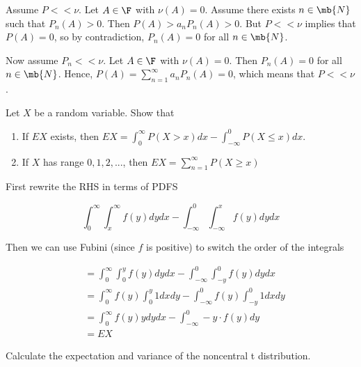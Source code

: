 \documentclass[]{book}
\providecommand{\tightlist}{%
  \setlength{\itemsep}{0pt}\setlength{\parskip}{0pt}}
\theoremstyle{definition}
\theoremstyle{definition}
\theoremstyle{definition}
\theoremstyle{remark}
\let\BeginKnitrBlock\begin \let\EndKnitrBlock\end
\begin{document}
\BeginKnitrBlock{solution}[Ex 35 b)]
\iffalse{} {Solution (Ex 35 b)). } \fi{}Assume \(P << \nu\). Let
\(A \in \F\) with \(\nu(A) = 0\). Assume there exists \(n \in \mb{N}\)
such that \(P_n(A) > 0\). Then \(P(A) > a_n P_n(A) > 0\). But
\(P << \nu\) implies that \(P(A) = 0\), so by contradiction,
\(P_n(A) = 0\) for all \(n \in \mb{N}\).

Now assume \(P_n << \nu\). Let \(A \in \F\) with \(\nu(A) = 0\). Then
\(P_n(A) = 0\) for all \(n \in \mb{N}\). Hence,
\(P(A) = \sum_{n=1}^\infty a_n P_n(A) = 0\), which means that
\(P << \nu\).
\EndKnitrBlock{solution}

\BeginKnitrBlock{exercise}[Ex 50]
\protect\hypertarget{exr:unnamed-chunk-47}{}{\label{exr:unnamed-chunk-47}
\iffalse (Ex 50) \fi{} }
\EndKnitrBlock{exercise}

\BeginKnitrBlock{exercise}[Ex 55]
\protect\hypertarget{exr:unnamed-chunk-48}{}{\label{exr:unnamed-chunk-48}
\iffalse (Ex 55) \fi{} } Let \(X\) be a random variable. Show that

\begin{enumerate}
\def\labelenumi{(\alph{enumi})}
\tightlist
\item
  If \(E X\) exists, then
  \(E X = \int_0^\infty P(X > x) dx - \int_{-\infty}^0 P(X \le x) dx\).
\item
  If \(X\) has range \(0, 1, 2, ...\), then
  \(E X = \sum_{n=1}^\infty P(X \ge x)\)
\end{enumerate}
\EndKnitrBlock{exercise}

\BeginKnitrBlock{solution}[EX 55 (a)]
\iffalse{} {Solution (EX 55 (a)). } \fi{} First rewrite the RHS in terms
of PDFS

\[\int_0^\infty \int_x^\infty f(y) dy dx - \int_{-\infty}^0 \int_{-\infty}^x f(y) dy dx\]

Then we can use Fubini (since \(f\) is positive) to switch the order of
the integrals

\[
\begin{aligned}
&= \int_0^\infty \int_0^y f(y) dy dx - \int_{-\infty}^0 \int_{-y}^0 f(y) dy dx \\
&= \int_0^\infty f(y) \int_0^y 1 dx dy - \int_{-\infty}^0 f(y) \int_{-y}^0 1 dx dy \\
&= \int_0^\infty f(y) y dy dx - \int_{-\infty}^0 -y \cdot f(y) dy \\
&= E X
\end{aligned}
\]
\EndKnitrBlock{solution}

\BeginKnitrBlock{exercise}[Ex 56]
\protect\hypertarget{exr:unnamed-chunk-50}{}{\label{exr:unnamed-chunk-50}
\iffalse (Ex 56) \fi{} }Calculate the expectation and variance of the
noncentral t distribution.
\EndKnitrBlock{exercise}
\end{document}
